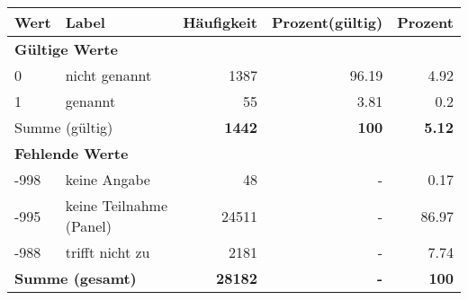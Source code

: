      \begin{longtable}{lXrrr}
     \toprule
     \textbf{Wert} & \textbf{Label} & \textbf{Häufigkeit} & \textbf{Prozent(gültig)} & \textbf{Prozent} \\
     \endhead
     \midrule
     \multicolumn{5}{l}{\textbf{Gültige Werte}}\\

     0 &
     \multicolumn{1}{X}{ nicht genannt   } &


       \num{1387} &
       \num[round-mode=places,round-precision=2]{96.19} &
         \num[round-mode=places,round-precision=2]{4.92} \\

     1 &
     \multicolumn{1}{X}{ genannt   } &


       \num{55} &
       \num[round-mode=places,round-precision=2]{3.81} &
         \num[round-mode=places,round-precision=2]{0.2} \\
     \midrule
     \multicolumn{2}{l}{Summe (gültig)} &
       \textbf{\num{1442}} &
     \textbf{\num{100}} &
       \textbf{\num[round-mode=places,round-precision=2]{5.12}} \\
     \multicolumn{5}{l}{\textbf{Fehlende Werte}}\\
       -998 &
       keine Angabe &
         \num{48} &
        - &
         \num[round-mode=places,round-precision=2]{0.17} \\
       -995 &
       keine Teilnahme (Panel) &
         \num{24511} &
        - &
         \num[round-mode=places,round-precision=2]{86.97} \\
       -988 &
       trifft nicht zu &
         \num{2181} &
        - &
         \num[round-mode=places,round-precision=2]{7.74} \\
     \midrule
     \multicolumn{2}{l}{\textbf{Summe (gesamt)}} &
          \textbf{\num{28182}} &
        \textbf{-} &
        \textbf{\num{100}} \\
     \bottomrule
     \end{longtable}
     
